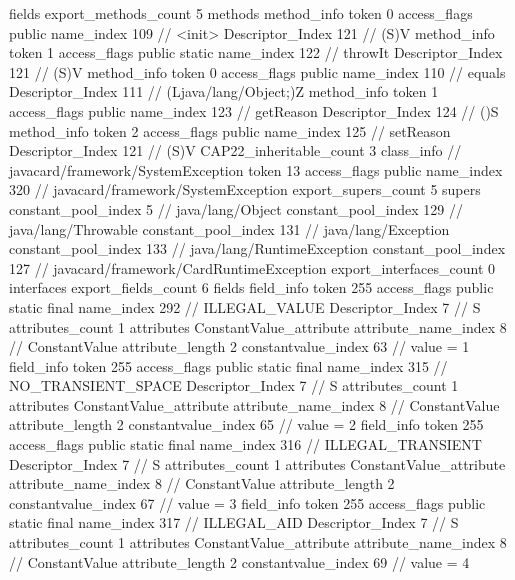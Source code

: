 {{{			fields {
			}
			export_methods_count	5
			methods {
				method_info {
					token	0
					access_flags	public
					name_index	109		// <init>
					Descriptor_Index	121		// (S)V
				}
				method_info {
					token	1
					access_flags	public static
					name_index	122		// throwIt
					Descriptor_Index	121		// (S)V
				}
				method_info {
					token	0
					access_flags	public
					name_index	110		// equals
					Descriptor_Index	111		// (Ljava/lang/Object;)Z
				}
				method_info {
					token	1
					access_flags	public
					name_index	123		// getReason
					Descriptor_Index	124		// ()S
				}
				method_info {
					token	2
					access_flags	public
					name_index	125		// setReason
					Descriptor_Index	121		// (S)V
				}
			}
			CAP22_inheritable_count	3
		}
		class_info {		// javacard/framework/SystemException
			token	13
			access_flags	public
			name_index	320		// javacard/framework/SystemException
			export_supers_count	5
			supers {
				constant_pool_index	5		// java/lang/Object
				constant_pool_index	129		// java/lang/Throwable
				constant_pool_index	131		// java/lang/Exception
				constant_pool_index	133		// java/lang/RuntimeException
				constant_pool_index	127		// javacard/framework/CardRuntimeException
			}
			export_interfaces_count	0
			interfaces {
			}
			export_fields_count	6
			fields {
			field_info {
				token	255
				access_flags	public static final
				name_index	292		// ILLEGAL_VALUE
				Descriptor_Index	7		// S
				attributes_count	1
				attributes {
				ConstantValue_attribute {
					attribute_name_index	8		// ConstantValue
					attribute_length	2
					constantvalue_index	63		// value = 1
				}
				}
			}
			field_info {
				token	255
				access_flags	public static final
				name_index	315		// NO_TRANSIENT_SPACE
				Descriptor_Index	7		// S
				attributes_count	1
				attributes {
				ConstantValue_attribute {
					attribute_name_index	8		// ConstantValue
					attribute_length	2
					constantvalue_index	65		// value = 2
				}
				}
			}
			field_info {
				token	255
				access_flags	public static final
				name_index	316		// ILLEGAL_TRANSIENT
				Descriptor_Index	7		// S
				attributes_count	1
				attributes {
				ConstantValue_attribute {
					attribute_name_index	8		// ConstantValue
					attribute_length	2
					constantvalue_index	67		// value = 3
				}
				}
			}
			field_info {
				token	255
				access_flags	public static final
				name_index	317		// ILLEGAL_AID
				Descriptor_Index	7		// S
				attributes_count	1
				attributes {
				ConstantValue_attribute {
					attribute_name_index	8		// ConstantValue
					attribute_length	2
					constantvalue_index	69		// value = 4
}}}}}}}
